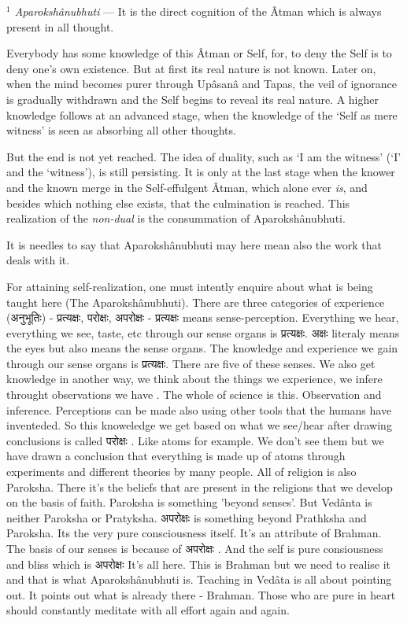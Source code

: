 \documentclass{article}
\begin{document}
{\small \textit{$^1$ Aparokshânubhuti} --- It is the direct cognition of the
Âtman which is always present in all thought.

Everybody has some knowledge of this Âtman or Self, for, to deny the Self is to
deny one's own existence. But at first its real nature is not known. Later on,
when the mind becomes purer through Upâsanâ and Tapas, the veil of ignorance is
gradually withdrawn and the Self begins to reveal its real nature. A higher
knowledge follows at an advanced stage, when the knowledge of the `Self as mere
witness' is seen as absorbing all other thoughts.

But the end is not yet reached. The idea of duality, such as `I am the witness'
(`I' and the `witness'), is still persisting. It is only at the last stage when
the knower and the known merge in the Self-effulgent Âtman, which alone ever
\textit{is}, and besides which nothing else exists, that the culmination is
reached. This realization of the \textit{non-dual} is the consummation of
Aparokshânubhuti.

It is needles to say that Aparokshânubhuti may here mean also the work that
deals with it.  }

\begin{oframed}
For attaining self-realization, one must intently enquire about what is being
taught here (The Aparokshânubhuti). There are three categories of experience
\texthindi{(अनुभूतिः)}
\texthindi{- प्रत्यक्षः, परोक्षः, अपरोक्षः -}
\texthindi{प्रत्यक्षः}
means sense-perception. Everything we hear, everything we see, taste, etc
through our sense organs is
\texthindi{प्रत्यक्षः}.
\texthindi{अक्षः} literaly means the eyes but also means
the sense organs. The knowledge and experience we gain
through our sense organs is
\texthindi{प्रत्यक्षः}.
There are five of these senses.  We also get knowledge in another way, we think
about the things we experience,  we infere throught observations we have . The
whole of science is this. Observation and inference. Perceptions can be made
also using other tools that the humans have inventeded. So this knoweledge we
get based on what we see/hear after drawing conclusions is called
\texthindi{परोक्षः}
. Like atoms for example. We don't see them but we have drawn a conclusion that
everything is made up of atoms through experiments and different theories
by many people. All of religion is also Paroksha. There it's the beliefs that
are present in the religions that we develop on the basis of faith. Paroksha
is something 'beyond senses'. But Vedânta is neither Paroksha or Pratyksha.
\texthindi{अपरोक्षः}
is something beyond Prathksha and Paroksha. Its the very pure consciousness
itself. It's an attribute of Brahman.
The basis of our senses is because of 
\texthindi{अपरोक्षः}
. And the self is pure consiousness and bliss which is
\texthindi{अपरोक्षः}
It's all here. This is Brahman but we need to realise it and that is what
Aparokshânubhuti is. Teaching in Vedâta is all about pointing out. It points
out what is already there - Brahman.
Those who are pure in heart should constantly meditate with all effort again
and again.

\end{oframed}
\end{document}

